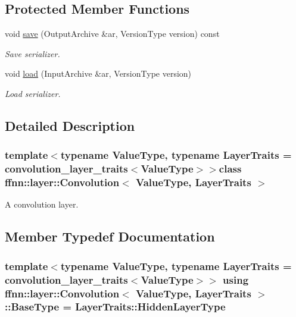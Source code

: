 \subsection*{Protected Member Functions}
\begin{DoxyCompactItemize}
\item 
void \hyperlink{classffnn_1_1layer_1_1_convolution_a14f7de8a42bb068019f6bdab62e6d332}{save} (Output\-Archive \&ar, Version\-Type version) const 
\begin{DoxyCompactList}\small\item\em Save serializer. \end{DoxyCompactList}\item 
void \hyperlink{classffnn_1_1layer_1_1_convolution_a7281b7f4edcc219e5e1bf6ee31e22cfd}{load} (Input\-Archive \&ar, Version\-Type version)
\begin{DoxyCompactList}\small\item\em Load serializer. \end{DoxyCompactList}\end{DoxyCompactItemize}


\subsection{Detailed Description}
\subsubsection*{template$<$typename Value\-Type, typename Layer\-Traits = convolution\-\_\-layer\-\_\-traits$<$\-Value\-Type$>$$>$class ffnn\-::layer\-::\-Convolution$<$ Value\-Type, Layer\-Traits $>$}

A convolution layer. 

\subsection{Member Typedef Documentation}
\hypertarget{classffnn_1_1layer_1_1_convolution_a473d9761dae92a5c7d3fa746647f2198}{
\subsubsection[{Base\-Type}]{\setlength{\rightskip}{0pt plus 5cm}template$<$typename Value\-Type, typename Layer\-Traits = convolution\-\_\-layer\-\_\-traits$<$\-Value\-Type$>$$>$ using {\bf ffnn\-::layer\-::\-Convolution}$<$ Value\-Type, Layer\-Traits $>$\-::{\bf Base\-Type} =  Layer\-Traits\-::\-Hidden\-Layer\-Type}}\label{classffnn_1_1layer_1_1_convolution_a473d9761dae92a5c7d3fa746647f2198}


